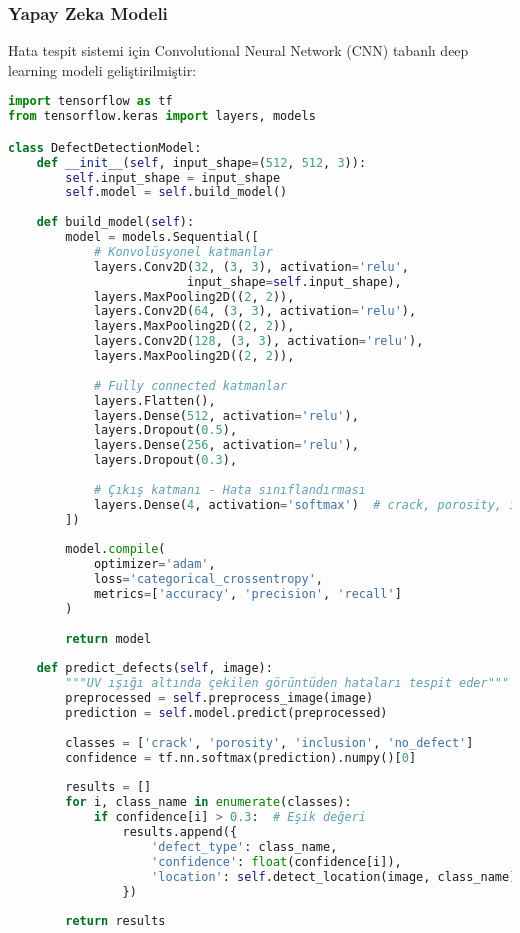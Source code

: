 \documentclass[12pt,a4paper]{article}
\begin{document}
\subsubsection{Yapay Zeka Modeli}

Hata tespit sistemi için Convolutional Neural Network (CNN) tabanlı deep learning modeli geliştirilmiştir:

\begin{lstlisting}[language=Python, caption=Hata Tespit AI Modeli]
import tensorflow as tf
from tensorflow.keras import layers, models

class DefectDetectionModel:
    def __init__(self, input_shape=(512, 512, 3)):
        self.input_shape = input_shape
        self.model = self.build_model()
    
    def build_model(self):
        model = models.Sequential([
            # Konvolüsyonel katmanlar
            layers.Conv2D(32, (3, 3), activation='relu', 
                         input_shape=self.input_shape),
            layers.MaxPooling2D((2, 2)),
            layers.Conv2D(64, (3, 3), activation='relu'),
            layers.MaxPooling2D((2, 2)),
            layers.Conv2D(128, (3, 3), activation='relu'),
            layers.MaxPooling2D((2, 2)),
            
            # Fully connected katmanlar
            layers.Flatten(),
            layers.Dense(512, activation='relu'),
            layers.Dropout(0.5),
            layers.Dense(256, activation='relu'),
            layers.Dropout(0.3),
            
            # Çıkış katmanı - Hata sınıflandırması
            layers.Dense(4, activation='softmax')  # crack, porosity, inclusion, no_defect
        ])
        
        model.compile(
            optimizer='adam',
            loss='categorical_crossentropy',
            metrics=['accuracy', 'precision', 'recall']
        )
        
        return model
    
    def predict_defects(self, image):
        """UV ışığı altında çekilen görüntüden hataları tespit eder"""
        preprocessed = self.preprocess_image(image)
        prediction = self.model.predict(preprocessed)
        
        classes = ['crack', 'porosity', 'inclusion', 'no_defect']
        confidence = tf.nn.softmax(prediction).numpy()[0]
        
        results = []
        for i, class_name in enumerate(classes):
            if confidence[i] > 0.3:  # Eşik değeri
                results.append({
                    'defect_type': class_name,
                    'confidence': float(confidence[i]),
                    'location': self.detect_location(image, class_name)
                })
        
        return results
\end{lstlisting}
\end{document}
